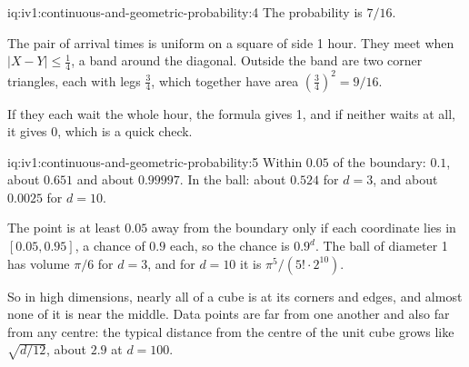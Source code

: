 \begin{solution}{iq:iv1:continuous-and-geometric-probability:4}
The probability is $7/16$.

The pair of arrival times is uniform on a square of side 1 hour. They meet when $|X - Y| \le \tfrac14$, a band around the diagonal. Outside the band are two corner triangles, each with legs $\tfrac34$, which together have area $(\tfrac34)^2 = 9/16$.

If they each wait the whole hour, the formula gives 1, and if neither waits at all, it gives 0, which is a quick check.

\end{solution}

\begin{solution}{iq:iv1:continuous-and-geometric-probability:5}
Within $0.05$ of the boundary: $0.1$, about $0.651$ and about $0.99997$. In the ball: about $0.524$ for $d = 3$, and about $0.0025$ for $d = 10$.

The point is at least $0.05$ away from the boundary only if each coordinate lies in $[0.05, 0.95]$, a chance of $0.9$ each, so the chance is $0.9^d$. The ball of diameter 1 has volume $\pi/6$ for $d = 3$, and for $d = 10$ it is $\pi^5/(5! \cdot 2^{10})$.

So in high dimensions, nearly all of a cube is at its corners and edges, and almost none of it is near the middle. Data points are far from one another and also far from any centre: the typical distance from the centre of the unit cube grows like $\sqrt{d/12}$, about $2.9$ at $d = 100$.

\end{solution}

